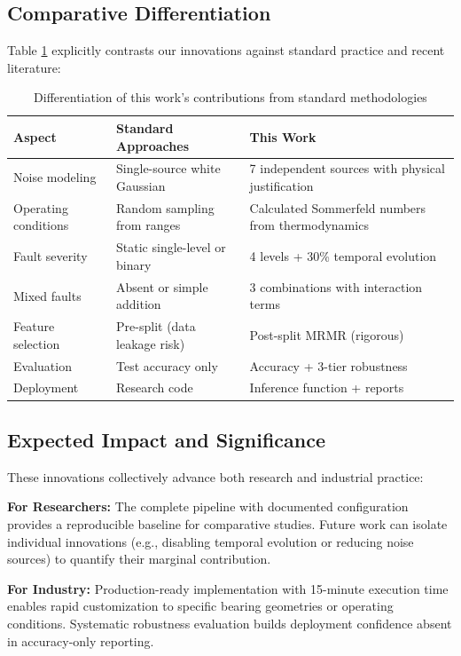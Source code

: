 \documentclass[11pt,a4paper]{article}
\begin{document}
\subsection{Comparative Differentiation}

Table \ref{tab:novelty_comparison} explicitly contrasts our innovations against standard practice and recent literature:

\begin{table}[h]
\centering
\small
\begin{tabular}{@{}p{3.5cm}p{5cm}p{5cm}@{}}
\toprule
\textbf{Aspect} & \textbf{Standard Approaches} & \textbf{This Work} \\
\midrule
Noise modeling & Single-source white Gaussian & 7 independent sources with physical justification \\
Operating conditions & Random sampling from ranges & Calculated Sommerfeld numbers from thermodynamics \\
Fault severity & Static single-level or binary & 4 levels + 30\% temporal evolution \\
Mixed faults & Absent or simple addition & 3 combinations with interaction terms \\
Feature selection & Pre-split (data leakage risk) & Post-split MRMR (rigorous) \\
Evaluation & Test accuracy only & Accuracy + 3-tier robustness \\
Deployment & Research code & Inference function + reports \\
\bottomrule
\end{tabular}
\caption{Differentiation of this work's contributions from standard methodologies}
\label{tab:novelty_comparison}
\end{table}

\subsection{Expected Impact and Significance}

These innovations collectively advance both research and industrial practice:

\textbf{For Researchers:} The complete pipeline with documented configuration provides a reproducible baseline for comparative studies. Future work can isolate individual innovations (e.g., disabling temporal evolution or reducing noise sources) to quantify their marginal contribution.

\textbf{For Industry:} Production-ready implementation with 15-minute execution time enables rapid customization to specific bearing geometries or operating conditions. Systematic robustness evaluation builds deployment confidence absent in accuracy-only reporting.
\end{document}
